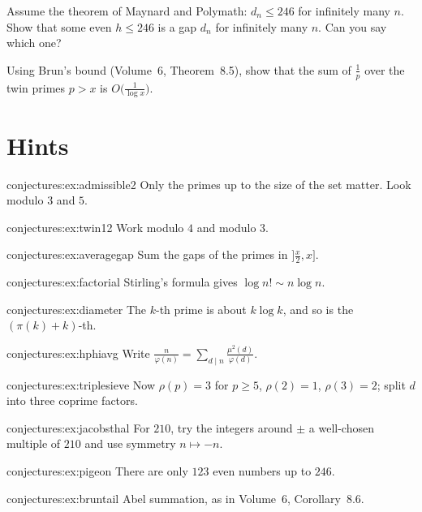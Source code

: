 \begin{exercise}[$\star$]\label{conjectures:ex:pigeon}
Assume the theorem of Maynard and Polymath: $d_n\le246$ for infinitely many $n$. Show that some even $h\le246$ is a gap $d_n$ for infinitely many $n$.
Can you say which one?
\end{exercise}

\begin{exercise}[$\star\star$]\label{conjectures:ex:bruntail}
Using Brun's bound (Volume~6, Theorem~8.5), show that the sum of $\frac1p$ over the twin primes $p>x$ is $O\bigl(\frac1{\log x}\bigr)$.
\end{exercise}

\section{Hints}

\begin{hint}{conjectures:ex:admissible2}
Only the primes up to the size of the set matter. Look modulo $3$ and $5$.
\end{hint}
\begin{hint}{conjectures:ex:twin12}
Work modulo $4$ and modulo $3$.
\end{hint}
\begin{hint}{conjectures:ex:averagegap}
Sum the gaps of the primes in $]\frac x2,x]$.
\end{hint}
\begin{hint}{conjectures:ex:factorial}
Stirling's formula gives $\log n!\sim n\log n$.
\end{hint}
\begin{hint}{conjectures:ex:diameter}
The $k$-th prime is about $k\log k$, and so is the $(\pi(k)+k)$-th.
\end{hint}
\begin{hint}{conjectures:ex:hphiavg}
Write $\frac n{\varphi(n)}=\sum_{d\mid n}\frac{\mu^2(d)}{\varphi(d)}$.
\end{hint}
\begin{hint}{conjectures:ex:triplesieve}
Now $\rho(p)=3$ for $p\ge5$, $\rho(2)=1$, $\rho(3)=2$; split $d$ into three coprime factors.
\end{hint}
\begin{hint}{conjectures:ex:jacobsthal}
For $210$, try the integers around $\pm$ a well-chosen multiple of $210$ and use symmetry $n\mapsto-n$.
\end{hint}
\begin{hint}{conjectures:ex:pigeon}
There are only $123$ even numbers up to $246$.
\end{hint}
\begin{hint}{conjectures:ex:bruntail}
Abel summation, as in Volume~6, Corollary~8.6.
\end{hint}

